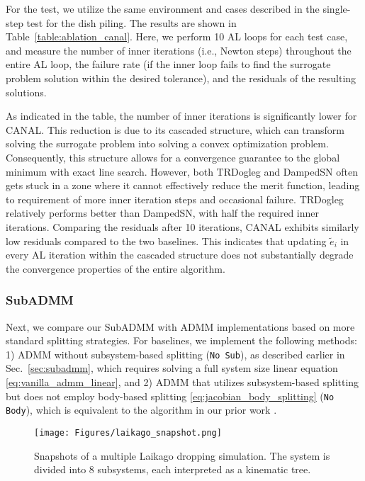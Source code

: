 \documentclass[lettersize,journal]{IEEEtran}
\begin{document}
For the test, we utilize the same environment and cases described in the single-step test for the dish piling. The results are shown in Table~\ref{table:ablation_canal}.  
Here, we perform 10 AL loops for each test case, and measure the number of inner iterations (i.e., Newton steps) throughout the entire AL loop, the failure rate (if the inner loop fails to find the surrogate problem solution within the desired tolerance), and the residuals of the resulting solutions.

As indicated in the table, the number of inner iterations is significantly lower for CANAL. This reduction is due to its cascaded structure, which can transform solving the surrogate problem into solving a convex optimization problem. Consequently, this structure allows for a convergence guarantee to the global minimum with exact line search.
However, both TRDogleg and DampedSN often gets stuck in a zone where it cannot effectively reduce the merit function, leading to requirement of more inner iteration steps and occasional failure. TRDogleg relatively performs better than DampedSN, with half the required inner iterations. 
Comparing the residuals after 10 iterations, CANAL exhibits similarly low residuals compared to the two baselines. This indicates that updating $\tilde{e}_i$ in every AL iteration within the cascaded structure does not substantially degrade the convergence properties of the entire algorithm.


\subsubsection{SubADMM}

Next, we compare our SubADMM with ADMM implementations based on more standard splitting strategies. For baselines, we implement the following methods: 1) ADMM without subsystem-based splitting (\texttt{No Sub}), as described earlier in Sec.~\ref{sec:subadmm}, which requires solving a full system size linear equation \eqref{eq:vanilla_admm_linear}, and 2) ADMM that utilizes subsystem-based splitting but does not employ body-based splitting \eqref{eq:jacobian_body_splitting} (\texttt{No Body}), which is equivalent to the algorithm in our prior work \cite{lee2023modular}.


\begin{figure}[t]
\centering
\texttt{[image: Figures/laikago\_snapshot.png]}
\caption{Snapshots of a multiple Laikago dropping simulation. The system is divided into 8 subsystems, each interpreted as a kinematic tree.}
\label{fig:laikagodrop_snapshot}
\end{figure}
\end{document}
